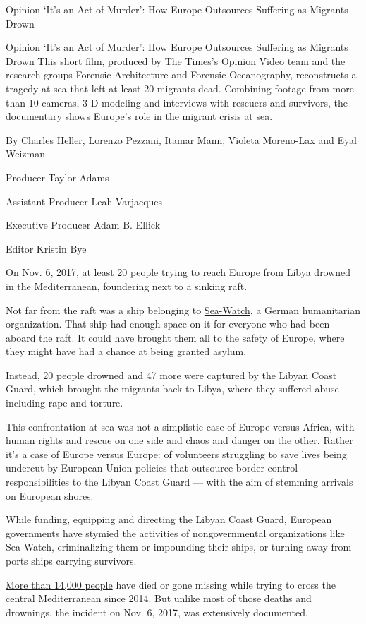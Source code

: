  Opinion `It's an Act of Murder': How Europe Outsources Suffering as
Migrants Drown

 Opinion `It's an Act of Murder': How Europe Outsources Suffering as
Migrants Drown This short film, produced by The Times's Opinion Video
team and the research groups Forensic Architecture and Forensic
Oceanography, reconstructs a tragedy at sea that left at least 20
migrants dead. Combining footage from more than 10 cameras, 3-D modeling
and interviews with rescuers and survivors, the documentary shows
Europe's role in the migrant crisis at sea.

By Charles Heller, Lorenzo Pezzani, Itamar Mann, Violeta Moreno-Lax and
Eyal Weizman

Producer Taylor Adams

Assistant Producer Leah Varjacques

Executive Producer Adam B. Ellick

Editor Kristin Bye

On Nov. 6, 2017, at least 20 people trying to reach Europe from Libya
drowned in the Mediterranean, foundering next to a sinking raft.

Not far from the raft was a ship belonging to
\href{https://sea-watch.org/en/}{Sea-Watch}, a German humanitarian
organization. That ship had enough space on it for everyone who had been
aboard the raft. It could have brought them all to the safety of Europe,
where they might have had a chance at being granted asylum.

Instead, 20 people drowned and 47 more were captured by the Libyan Coast
Guard, which brought the migrants back to Libya, where they suffered
abuse --- including rape and torture.

This confrontation at sea was not a simplistic case of Europe versus
Africa, with human rights and rescue on one side and chaos and danger on
the other. Rather it's a case of Europe versus Europe: of volunteers
struggling to save lives being undercut by European Union policies that
outsource border control responsibilities to the Libyan Coast Guard ---
with the aim of stemming arrivals on European shores.

While funding, equipping and directing the Libyan Coast Guard, European
governments have stymied the activities of nongovernmental organizations
like Sea-Watch, criminalizing them or impounding their ships, or turning
away from ports ships carrying survivors.

\href{https://missingmigrants.iom.int/region/mediterranean?migrant_route\%5B\%5D=1376}{More
than 14,000 people} have died or gone missing while trying to cross the
central Mediterranean since 2014. But unlike most of those deaths and
drownings, the incident on Nov. 6, 2017, was extensively documented.

